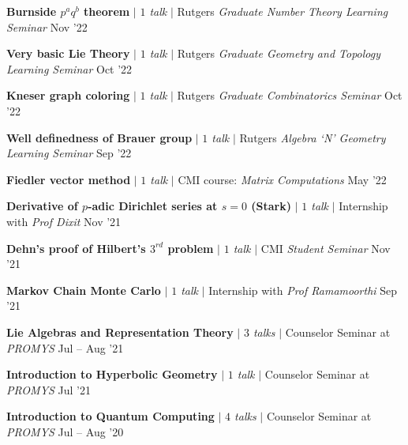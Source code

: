 \resumeProjectHeading
{\textbf{Burnside $p^aq^b$ theorem} $|$ \emph{$1$ talk} $|$ Rutgers \textit{Graduate Number Theory Learning Seminar}}
{Nov '22}
{}
\vspace{\mygap}

\resumeProjectHeading
{\textbf{Very basic Lie Theory} $|$ \emph{$1$ talk} $|$ Rutgers \textit{Graduate Geometry and Topology Learning Seminar}}
{Oct '22}
{}
\vspace{\mygap}

\resumeProjectHeading
{\textbf{Kneser graph coloring} $|$ \emph{$1$ talk} $|$ Rutgers \textit{Graduate Combinatorics Seminar}}
{Oct '22}
{}
\vspace{\mygap}


\resumeProjectHeading
{\textbf{Well definedness of Brauer group} $|$ \emph{$1$ talk} $|$ Rutgers \textit{Algebra `N' Geometry Learning Seminar}}
{Sep '22}
{}
\vspace{\mygap}


\resumeProjectHeading
{\textbf{Fiedler vector method} $|$ \emph{$1$ talk} $|$ CMI course: \textit{Matrix Computations}}
{May '22}
{}
\vspace{\mygap}

\resumeProjectHeading
{\textbf{Derivative of $p$-adic Dirichlet series at $s=0$ (Stark)} $|$ \emph{$1$ talk} $|$ Internship with \textit{Prof Dixit}}
{Nov '21}
{}
\vspace{\mygap}

\resumeProjectHeading
{\textbf{Dehn's proof of Hilbert's $3^{rd}$ problem} $|$ \emph{$1$ talk} $|$ CMI \textit{Student Seminar}}
{Nov '21}
{}
\vspace{\mygap}

\resumeProjectHeading
{\textbf{Markov Chain Monte Carlo} $|$ \emph{$1$ talk} $|$ Internship with \textit{Prof Ramamoorthi}}
{Sep '21}
{}
\vspace{\mygap}


\resumeProjectHeading
{\textbf{Lie Algebras and Representation Theory} $|$ \emph{$3$ talks} $|$ Counselor Seminar at \textit{PROMYS}}
{Jul -- Aug '21}
{}
\vspace{\mygap}

\resumeProjectHeading
{\textbf{Introduction to Hyperbolic Geometry} $|$ \emph{$1$ talk} $|$ Counselor Seminar at \textit{PROMYS}}
{Jul '21}
{}
\vspace{\mygap}

\resumeProjectHeading
{\textbf{Introduction to Quantum Computing} $|$ \emph{$4$ talks} $|$ Counselor Seminar at \textit{PROMYS}}
{Jul -- Aug '20}
{}
\resumeSubHeadingListEnd

